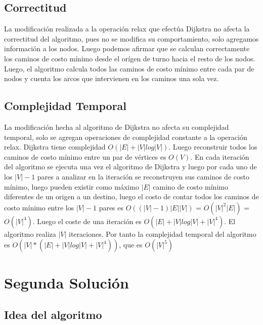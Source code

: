 \documentclass[article]{llncs}
\begin{document}
\subsection{Correctitud}

La modificaci\'on realizada a la operaci\'on relax que efect\'ua Dijkstra no afecta la correctitud 
del algoritmo, pues no se modifica su comportamiento, solo agregamos informaci\'on a los nodos. Luego 
podemos afirmar que se calculan correctamente los caminos de costo m\'inimo desde el or\'igen de turno 
hacia el resto de los nodos. Luego, el algoritmo calcula todos las caminos de costo m\'inimo entre cada 
par de nodos y cuenta los arcos que intervienen en los caminos una sola vez. 

\subsection{Complejidad Temporal}

La modificaci\'on hecha al algoritmo de Dijkstra no afecta su complejidad temporal, solo se agregan operaciones de complejidad 
constante a la operaci\'on relax.
Dijkstra tiene complejidad $O(|E| + |V|log|V|)$. Luego reconstruir todos los caminos de costo m\'inimo 
entre un par de v\'ertices es $O(V)$. En cada iteraci\'on del algoritmo se ejecuta una vez el algoritmo 
de Dijkstra y luego por cada uno de los $|V| - 1$ pares a analizar en la iteraci\'on se reconstruyen sus 
caminos de costo m\'inimo, luego pueden existir como m\'aximo $|E|$ camino de costo m\'inimo diferentes 
de un origen a un destino, luego el costo de contar todos los caminos de costo m\'inimo entre los $|V| - 1$
pares es $O((|V|-1)|E||V|)$ = $O(|V|^2|E|)$ = $O(|V|^4)$. Luego el coste de una iteraci\'on es $O(|E| + |V|log|V| + |V|^4)$. 
El algoritmo realiza $|V|$ iteraciones. Por tanto la complejidad temporal del algoritmo es $O(|V|*(|E| + |V|log|V| + |V|^4))$, 
que es $O(|V|^5)$

\section{Segunda Solución}

\subsection{Idea del algoritmo}
\end{document}
